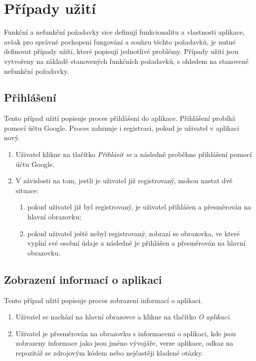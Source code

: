 \let\oldsubsection=\thesubsection
\renewcommand\thesubsection{UC\arabic{subsection}} %

\section{Případy užití}

Funkční a nefunkční požadavky sice definují funkcionalitu a vlastnosti aplikace,
avšak pro správné pochopení fungování a souhru těchto požadavků,
je nutné definovat případy užití,
které popisují jednotlivé problémy.
Případy užití jsou vytvořeny na základě stanovených funkčních požadavků,
s ohledem na stanovené nefunkční požadavky.

\subsection{Přihlášení}
\label{uc:login}

Tento případ užití popisuje proces přihlášení do aplikace.
Přihlášení probíhá pomocí účtu Google.
Proces zahrnuje i registraci,
pokud je uživatel v aplikaci nový.

\begin{enumerate}
    \item Uživatel klikne na tlačítko \emph{Přihlásit se}
    a následně proběhne přihlášení pomocí účtu Google.
    \item V závislosti na tom,
    jestli je uživatel již registrovaný,
    mohou nastat dvě situace:
    \begin{enumerate}
        \item pokud uživatel již byl registrovaný,
        je uživatel přihlášen a přesměrován na hlavní obrazovku;
        \item pokud uživatel ještě nebyl registrovaný,
        zobrazí se obrazovka,
        ve které vyplní své osobní údaje
        a následně je přihlášen a přesměrován na hlavní obrazovku.
    \end{enumerate}
\end{enumerate}

\subsection{Zobrazení informací o aplikaci}

Tento případ užití popisuje proces zobrazení informací o aplikaci.

\begin{enumerate}
    \item Uživatel se nachází na hlavní obrazovce a klikne na tlačítko
    \emph{O aplikaci}.
    \item Uživatel je přesměrován na obrazovku s informacemi o aplikaci,
    kde jsou zobrazeny informace jako jsou jméno vývojáře, verze aplikace,
    odkaz na repozitář se zdrojovým kódem nebo nejčastěji kladené otázky.
\end{enumerate}

